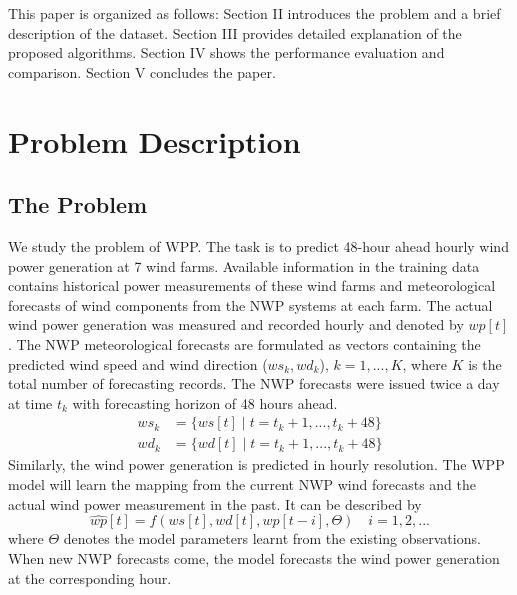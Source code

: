 \documentclass[conference]{IEEEtran}
\begin{document}
This paper is organized as follows: Section II introduces the problem and a brief description of the dataset. Section III provides detailed explanation of the proposed algorithms. Section IV shows the performance evaluation and comparison. Section V concludes the paper.






\section{Problem Description}

\subsection{The Problem}
We study the problem of WPP. The task is to predict 48-hour ahead hourly wind power generation at 7 wind farms. Available information in the training data contains historical power measurements of these wind farms and meteorological forecasts of wind components from the NWP systems at each farm. The actual wind power generation was measured and recorded hourly and denoted by $wp[t]$. The NWP meteorological forecasts are formulated as vectors containing the predicted wind speed and wind direction ($ws_k, wd_k$), $k=1,...,K$, where $K$ is the total number of forecasting records. The NWP forecasts were issued twice a day at time $t_k$ with forecasting horizon of 48 hours ahead.
\begin{equation}
\begin{aligned}
ws_k &= \{ ws[t] \mid t = t_k + 1,..., t_k + 48 \} \\
wd_k &= \{ wd[t] \mid t = t_k + 1,..., t_k + 48 \}
\end{aligned}
\end{equation}
Similarly, the wind power generation is predicted in hourly resolution. The WPP model will learn the mapping from the current NWP wind forecasts and the actual wind power measurement in the past. It can be described by
\begin{equation}
\hat{wp}[t] = f(ws[t], wd[t], wp[t-i], \Theta) \quad i = 1, 2, ...
\end{equation}
where $\Theta$ denotes the model parameters learnt from the existing observations. When new NWP forecasts come, the model forecasts the wind power generation at the corresponding hour. %
\end{document}
